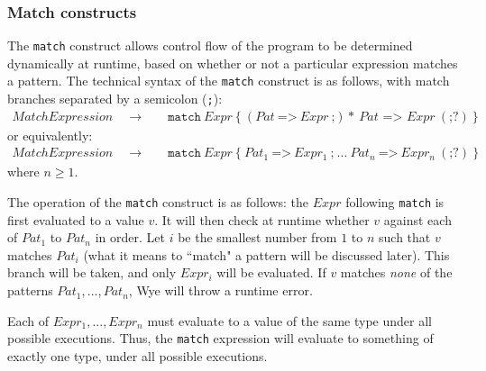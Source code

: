 \documentclass[a4paper, 12pt]{article}
\newcommand{\substo}{\quad\rightarrow\quad}
\begin{document}
\subsubsection{Match constructs}
The \texttt{match} construct allows control flow of the program to be determined dynamically at runtime, based on whether or not a particular expression matches a pattern. The technical syntax of the \texttt{match} construct is as follows, with match branches separated by a semicolon (\texttt{;}):
\begin{align*}
MatchExpression \substo& \texttt{match}\: Expr \: \texttt{\{} \: (Pat \: \texttt{=>}\: Expr\: \texttt{;})*\: Pat\texttt{ => } Expr \: (\texttt{;}?) \: \texttt{\}}
\end{align*}
or equivalently:
\begin{align*}
MatchExpression \substo& \texttt{match}\: Expr \: \texttt{\{} \: Pat_1 \: \texttt{=>}\: Expr_1\: \texttt{;} \:  ... \: Pat_n \: \texttt{=>}\: Expr_n\: (\texttt{;}?) \: \texttt{\}}
\end{align*}
where $n \geq 1$. 

The operation of the \texttt{match} construct is as follows: the $Expr$ following \texttt{match} is first evaluated to a value $v$. It will then check at runtime whether $v$ against each of $Pat_1$ to $Pat_n$ in order. Let $i$ be the smallest number from $1$ to $n$ such that $v$ matches $Pat_i$ (what it means to ``match" a pattern will be discussed later). This branch will be taken, and only $Expr_i$ will be evaluated. If $v$ matches \textit{none} of the patterns $Pat_1, ..., Pat_n$, Wye will throw a runtime error. 

Each of $Expr_1, ..., Expr_n$ must evaluate to a value of the same type under all possible executions. Thus, the \texttt{match} expression will evaluate to something of exactly one type, under all possible executions.
\end{document}
